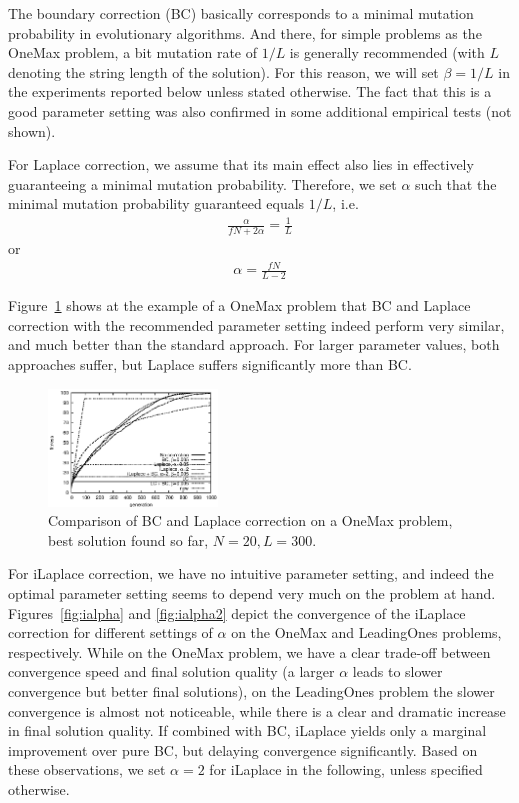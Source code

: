 \documentclass{acm_proc_article-sp}
\newcommand{\Np}{N}
\begin{document}
The boundary correction (BC) basically corresponds to a minimal
mutation probability in evolutionary algorithms. And there, for simple
problems as the OneMax problem, a bit mutation rate of $1/L$ is
generally recommended (with $L$ denoting the string length of the
solution). For this reason, we will set $\beta=1/L$ in the experiments
reported below unless stated otherwise. The fact that this is a good parameter
setting was also confirmed in some additional empirical tests (not shown).

For Laplace correction, we assume that its main effect also lies in effectively
guaranteeing a minimal mutation probability. Therefore, we set $\alpha$ such that
the minimal mutation probability guaranteed equals $1/L$, i.e.\
\begin{eqnarray}
\frac{\alpha}{f\Np+2\alpha}=\frac{1}{L}
\end{eqnarray}
or
\begin{eqnarray}
\alpha=\frac{f\Np}{L-2}
\end{eqnarray}

Figure~\ref{fig:alpha} shows at the example of a OneMax problem
that BC and Laplace correction
with the recommended parameter setting indeed perform very similar,
and much better than the standard approach.
For larger parameter values, both approaches suffer, but Laplace
suffers significantly more than BC.

\begin{figure}
\centerline{
\includegraphics[width=0.4\textwidth]{graph_leading1169910391/graph_leading000_fitness.eps}}
\caption{Comparison of BC and Laplace correction on a OneMax problem, best solution found so far, $\Np=20, L=300$.\label{fig:alpha}}
\end{figure}

For iLaplace correction, we have no intuitive parameter setting, and indeed the optimal
parameter setting seems to depend very much on the problem at hand.
Figures~\ref{fig:ialpha} and \ref{fig:ialpha2} depict the convergence of the iLaplace
correction for different settings of $\alpha$ on the OneMax and LeadingOnes problems, respectively. While on the OneMax problem, we have a clear trade-off between convergence speed and
final solution quality (a larger $\alpha$ leads to slower convergence but better final solutions), on the LeadingOnes problem the slower convergence is almost not noticeable,
while there is a clear and dramatic increase in final solution quality.
If combined with BC, iLaplace yields only a marginal improvement over pure BC, but delaying convergence significantly.
Based on these observations,  we set $\alpha=2$ for
iLaplace in the following, unless specified otherwise.
\end{document}
